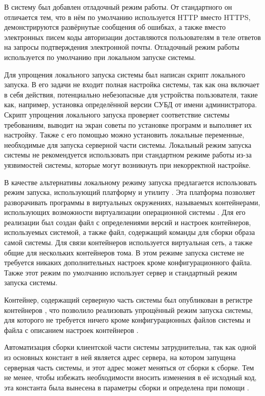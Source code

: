 \tab
В систему был добавлен отладочный режим работы.
От стандартного он отличается тем, что в нём по умолчанию используется HTTP вместо HTTPS, демонстрируются развёрнутые сообщения об ошибках, а также вместо электронных писем коды авторизации доставляются пользователям в теле ответов на запросы подтверждения электронной почты.
Отладочный режим работы используется по умолчанию при локальном запуске системы.

\tab
Для упрощения локального запуска системы был написан скрипт локального запуска.
В его задачи не входит полная настройка системы, так как она включает в себя действия, потенциально небезопасные для устройства пользователя, такие как, например, установка определённой версии СУБД от имени администратора.
Скрипт упрощения локального запуска проверяет соответствие системы требованиям, выводит на экран советы по установке программ и выполняет их настройку.
Также с его помощью можно установить локальные переменные, необходимые для запуска серверной части системы.
Локальный режим запуска системы не рекомендуется использовать при стандартном режиме работы из-за уязвимостей системы, которые могут возникнуть при некорректной настройке.

\tab
В качестве альтернативы локальному режиму запуска предлагается использовать режим запуска, использующий платформу  и утилиту .
Эта платформа позволяет разворачивать программы в виртуальных окружениях, называемых контейнерами, использующих возможности виртуализации операционной системы .
Для его реализации был создан файл с определениями версий и настроек контейнеров, используемых системой, а также файл, содержащий команды для сборки образа самой системы.
Для связи контейнеров используется виртуальная сеть, а также общие для нескольких контейнеров тома.
В этом режиме запуска системе не требуется никаких дополнительных настроек кроме конфигурационного файла.
Также этот режим по умолчанию использует сервер  и стандартный режим запуска системы.

\tab
Контейнер, содержащий серверную часть системы был опубликован в регистре контейнеров \cite{container-register}, что позволило реализовать упрощённый режим запуска системы, для которого не требуется ничего кроме конфигурационных файлов системы и файла с описанием настроек контейнеров .

\tab
Автоматизация сборки клиентской части системы затруднительна, так как одной из основных констант в ней является адрес сервера, на котором запущена серверная часть системы, и этот адрес может меняться от сборки к сборке.
Тем не менее, чтобы избежать необходимости вносить изменения в её исходный код, эта константа была вынесена в параметры сборки и определена при помощи .


